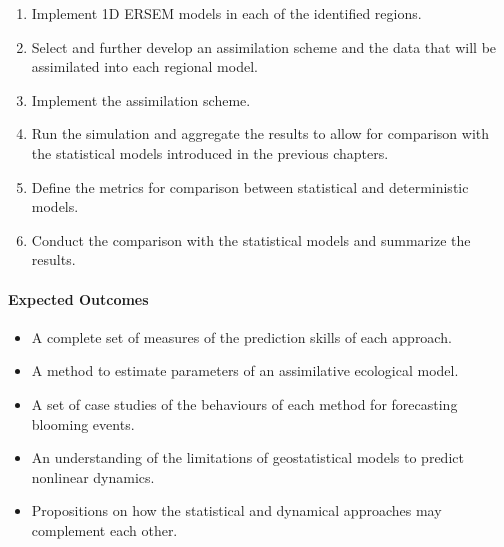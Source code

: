 \begin{enumerate}

\item Implement 1D ERSEM models in each of the identified regions.

\item Select and further develop an assimilation scheme and the data that will
be assimilated into each regional model.

\item Implement the assimilation scheme.

\item Run the simulation and aggregate the results to allow for comparison with
the statistical models introduced in the previous chapters.

\item Define the metrics for comparison between statistical and deterministic
models.

\item Conduct the comparison with the statistical models and summarize the
results.

\end{enumerate}

\paragraph{Expected Outcomes}

\begin{itemize}

\item A complete set of measures of the prediction skills of each approach.

\item A method to estimate parameters of an assimilative ecological model.

\item A set of case studies of the behaviours of each method for forecasting
blooming events.

\item An understanding of the limitations of geostatistical models to predict
nonlinear dynamics. 

\item Propositions on how the statistical and dynamical approaches may
complement each other.

\end{itemize}
